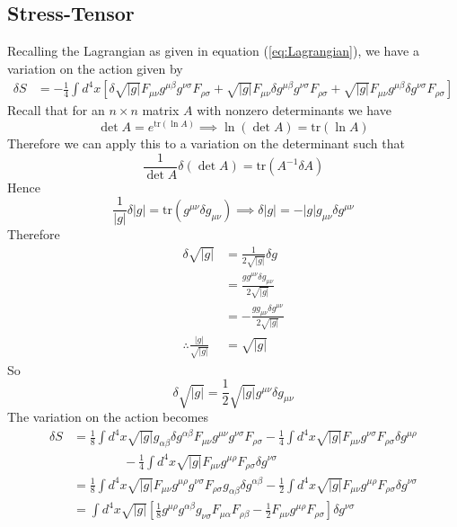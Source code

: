 \documentclass{article}
\begin{document}
 	\subsection{Stress-Tensor}
 	Recalling the Lagrangian as given in equation (\ref{eq:Lagrangian}), we have a variation on the action given by
 	\begin{align*}
 		\delta S &= -\frac14 \int d^4 x \left[
 			\delta \sqrt{|g|} F_{\mu\nu} g^{\mu\beta} g^{\nu\sigma} F_{\rho\sigma} + 	 \sqrt{|g|} F_{\mu\nu} \delta g^{\mu\beta} g^{\nu\sigma} F_{\rho\sigma} +  \sqrt{|g|} F_{\mu\nu} g^{\mu\beta} \delta g^{\nu\sigma} F_{\rho\sigma}
 		\right] 
 	\end{align*}
 	Recall that for an $n\times n$ matrix $A$ with nonzero determinants we have
 	\begin{equation}
 		\label{propertyLA}
 			\det A = e^{\text{tr} \left( \ln A\right)} \implies \ln\left(\det A \right) = \text{tr} \left( \ln A\right)
 	\end{equation}
 	Therefore we can apply this to a variation on the determinant such that
 	\begin{equation}
 		\label{eq:Consequence}
 		\frac{1}{\det A} \delta \left( \det A \right) = \text{tr} \left( A^{-1} \delta A \right)
 	\end{equation}
 	Hence
 	\begin{equation}
 		\label{MetricEquation}
 		\frac{1}{|g|} \delta |g| = \text{tr} \left( g^{\mu\nu} \delta g_{\mu\nu}\right) \implies \delta |g| = -|g|g_{\mu\nu} \delta g^{\mu\nu}
 	\end{equation}
 	Therefore
 	\begin{align*}
 		\delta \sqrt{|g|} &= \frac{1}{2\sqrt{|g|}} \delta g \\
 		&= \frac{g g^{\mu\nu} \delta g_{\mu\nu}}{2 \sqrt{|g|}} \\
 		&= -\frac{g g_{\mu\nu} \delta g^{\mu\nu}}{2 \sqrt{|g|}}\\
 		\therefore \frac{|g|}{\sqrt{|g|}} &= \sqrt{|g|}
 	\end{align*}
 	So
 	\begin{equation}
 		\label{VariationMetric}
 		\delta \sqrt{|g|} = \frac12 \sqrt{|g|} g^{\mu\nu} \delta g_{\mu\nu}
 	\end{equation}
 	The variation on the action becomes
 	\begin{align*}
 		\delta S &= \frac18 \int d^4 x \sqrt{|g|} g_{\alpha \beta} \delta g^{\alpha \beta} F_{\mu\nu} g^{\mu\nu} g^{\nu\sigma} F_{\rho\sigma} - \frac14 \int d^4 x \sqrt{|g|}F_{\mu\nu} g^{\nu\sigma} F_{\rho\sigma} \delta g^{\mu \rho} \\
 		&\quad\quad\quad\quad- \frac14 \int d^4 x \sqrt{|g|}F_{\mu\nu} g^{\mu\rho} F_{\rho\sigma} \delta g^{\nu \sigma} \\
 		&= \frac18 \int d^4 x \sqrt{|g|} F_{\mu\nu} g^{\mu\rho} g^{\nu\sigma} F_{\rho\sigma} g_{\alpha \beta} \delta g^{\alpha \beta} - \frac12 \int d^4 x \sqrt{|g|} F_{\mu\nu} g^{\mu\rho} F_{\rho\sigma} \delta g^{\nu\sigma} \\
 		&= \int d^4 x \sqrt{|g|} \left[ \frac18 g^{\mu\rho} g^{\alpha\beta} g_{\nu\sigma} F_{\mu\alpha} F_{\rho\beta} - \frac12 F_{\mu\nu} g^{\mu\rho} F_{\rho\sigma} \right] \delta g^{\nu\sigma} 
 	\end{align*}
\end{document}
